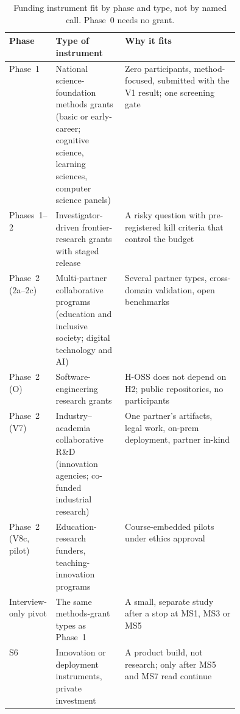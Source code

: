\begin{table}[htbp]
  \centering
  \footnotesize
  \caption{Funding instrument fit by phase and type, not by named call. Phase~0 needs no
    grant.}
  \label{tab:resources-funding}
  \begin{tabularx}{\linewidth}{@{}p{0.14\linewidth}p{0.3\linewidth}X@{}}
    \toprule
    Phase & Type of instrument & Why it fits \\
    \midrule
    Phase~1 & National science-foundation methods grants (basic or early-career; cognitive
      science, learning sciences, computer science panels) & Zero participants, method-focused,
      submitted with the V1 result; one screening gate \\
    Phases~1--2 & Investigator-driven frontier-research grants with staged release & A risky
      question with pre-registered kill criteria that control the budget \\
    Phase~2 (2a--2c) & Multi-partner collaborative programs (education and inclusive society;
      digital technology and AI) & Several partner types, cross-domain validation, open
      benchmarks \\
    Phase~2 (O) & Software-engineering research grants & H-OSS does not depend on H2; public
      repositories, no participants \\
    Phase~2 (V7) & Industry--academia collaborative R\&D (innovation agencies; co-funded
      industrial research) & One partner's artifacts, legal work, on-prem deployment, partner
      in-kind \\
    Phase~2 (V8c, pilot) & Education-research funders, teaching-innovation programs &
      Course-embedded pilots under ethics approval \\
    Interview-only pivot & The same methods-grant types as Phase~1 & A small, separate study
      after a stop at MS1, MS3 or MS5 \\
    S6 & Innovation or deployment instruments, private investment & A product build, not
      research; only after MS5 and MS7 read continue \\
    \bottomrule
  \end{tabularx}
\end{table}

